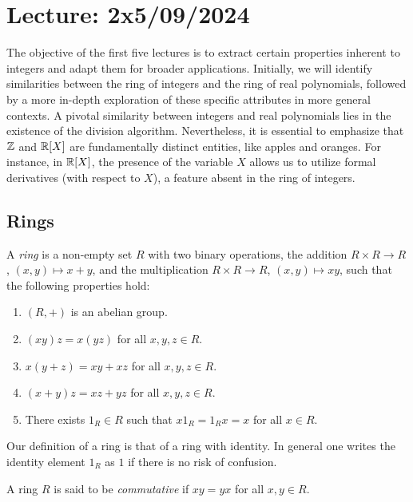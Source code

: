 \section{Lecture: 2x5/09/2024}

The objective of the first five lectures is to extract certain properties inherent to integers and adapt them for broader applications. Initially, we will identify similarities between the ring of integers and the ring of real polynomials, 
followed by a more in-depth exploration of these specific attributes in more general contexts. A pivotal similarity between integers and real polynomials lies in the existence of the division algorithm. Nevertheless, it is essential to emphasize that $\mathbb{Z}$ and $\mathbb{R}[X]$ are fundamentally distinct entities, like apples and oranges. For instance, in $\mathbb{R}[X]$, 
the presence of the variable $X$ allows us to utilize formal derivatives 
(with respect to $X$), a feature absent in the ring of integers. 

\subsection{Rings}

\begin{definition}
A \emph{ring} is a non-empty set $R$ with two binary operations, the addition
$R\times R\to R$, $(x,y)\mapsto x+y$, and the multiplication
$R\times R\to R$, $(x,y)\mapsto xy$, such that
the following properties hold:
\begin{enumerate}
    \item $(R,+)$ is an abelian group.
    \item $(xy)z=x(yz)$ for all $x,y,z\in R$.
    \item $x(y+z)=xy+xz$ for all $x,y,z\in R$.
    \item $(x+y)z=xz+yz$ for all $x,y,z\in R$.
    \item There exists $1_R\in R$ such that $x1_R=1_Rx=x$ for all $x\in R$.
\end{enumerate}
\end{definition}

Our definition of a ring is that of a ring with identity. In general one
writes the identity element $1_R$ as $1$ if there is no risk of confusion.

\begin{definition}
A ring $R$ is said to be \emph{commutative} if $xy=yx$ for all $x,y\in R$. 
\end{definition}

